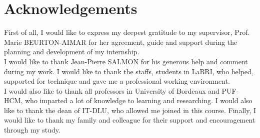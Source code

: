 \chapter*{Acknowledgements}
\thispagestyle{empty}
\indent First of all, I would like to express my deepest gratitude to my supervisor, Prof. Marie BEURTON-AIMAR for her agreement, guide and support during the planning and development of my internship.\\[0.3cm]
I would like to thank Jean-Pierre SALMON for his generous help and comment during my work. I would like to thank the staffs, students in LaBRI, who helped, supported for technique and gave me a professional working environment. 
\\[0.3cm]
I would also like to thank all professors in University of Bordeaux and PUF-HCM, who imparted a lot of knowledge to learning and researching. I would also like to thank the dean of IT-DLU, who allowed me joined in this course. 
Finally, I would like to thank my family and colleague for their support and encouragement through my study.
\clearpage